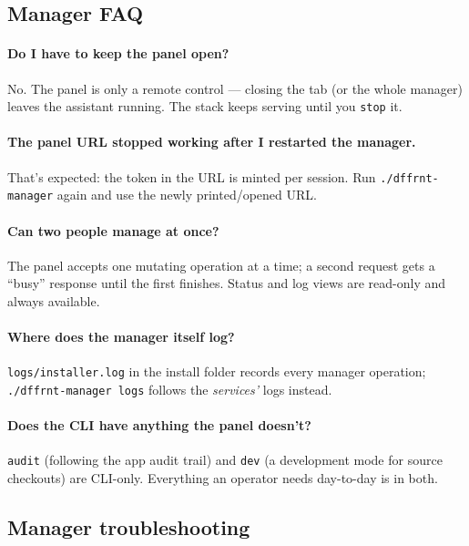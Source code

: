 \documentclass[11pt,letterpaper]{article}
\begin{document}
\subsection{Manager FAQ}

\paragraph{Do I have to keep the panel open?}
No. The panel is only a remote control --- closing the tab (or the whole
manager) leaves the assistant running. The stack keeps serving until you
\texttt{stop} it.

\paragraph{The panel URL stopped working after I restarted the manager.}
That's expected: the token in the URL is minted per session. Run
\texttt{./dffrnt-manager} again and use the newly printed/opened URL.

\paragraph{Can two people manage at once?}
The panel accepts one mutating operation at a time; a second request gets a
``busy'' response until the first finishes. Status and log views are
read-only and always available.

\paragraph{Where does the manager itself log?}
\texttt{logs/installer.log} in the install folder records every manager
operation; \texttt{./dffrnt-manager logs} follows the \emph{services'} logs
instead.

\paragraph{Does the CLI have anything the panel doesn't?}
\texttt{audit} (following the app audit trail) and \texttt{dev} (a
development mode for source checkouts) are CLI-only. Everything an operator
needs day-to-day is in both.

\subsection{Manager troubleshooting}
\end{document}
